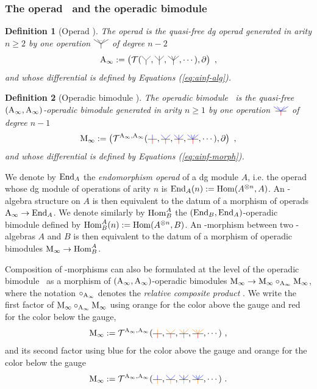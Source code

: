 \documentclass[twoside, 11pt]{amsart}
\newtheorem{definition}{Definition}[section]
\theoremstyle{remark}
\begin{document}
\subsubsection{The operad \Ainf\ and the operadic bimodule \Minf} \label{sss:operad-ainf-operadic-bimod-minf}

\begin{definition}[Operad \Ainf]
The \emph{operad \Ainf} is the quasi-free dg operad generated in arity $n \geq 2$ by one operation $\arbreop{0.15}$ of degree $n-2$ 
\[ \Ainf := \left( \mathcal{T}( \arbreopdeux , \arbreoptrois, \arbreopquatre , \cdots ) , \partial \right) \ , \]
and whose differential is defined by Equations (\ref{eq:ainf-alg}).
\end{definition}

\begin{definition}[Operadic bimodule \Minf]
The operadic bimodule \Minf\ is the quasi-free $(\mathrm{A}_\infty ,\mathrm{A}_\infty )$-operadic bimodule generated in arity $n \geq 1$ by one operation $\arbreopmorph{0.15}$ of degree $n-1$ 
\[ \Minf :=  \left( \mathcal{T}^{\Ainf , \Ainf}(\arbreopunmorph , \arbreopdeuxmorph , \arbreoptroismorph , \arbreopquatremorph , \cdots ) , \partial \right) \ , \]
and whose differential is defined by Equations (\ref{eq:ainf-morph}).
\end{definition}

We denote by $\mathrm{End}_A$ the \textit{endomorphism operad} of a dg module $A$, i.e. the operad whose dg module of operations of arity $n$ is $\mathrm{End}_A(n) := \mathrm{Hom} (A^{\otimes n},A)$. 
An \Ainf -algebra structure on $A$ is then equivalent to the datum of a morphism of operads $\mathrm{A}_\infty \rightarrow \mathrm{End}_A$. 
We denote similarly by $\mathrm{Hom}^A_B$ the $(\mathrm{End}_B , \mathrm{End}_A)$-operadic bimodule defined by $ \mathrm{Hom}^A_B(n) := \mathrm{Hom} (A^{\otimes n},B)$. 
An \Ainf -morphism between two \Ainf -algebras $A$ and $B$ is then equivalent to the datum of a morphism of operadic bimodules $\mathrm{M}_\infty \rightarrow \mathrm{Hom}^A_B$.

Composition of \Ainf -morphisms can also be formulated at the level of the operadic bimodule \Minf\ as a morphism of $(\mathrm{A}_\infty , \mathrm{A}_\infty)$-operadic bimodules $\mathrm{M}_\infty \rightarrow \mathrm{M}_\infty \circ_{\mathrm{A}_\infty} \mathrm{M}_\infty$, where the notation $\circ_{\mathrm{A}_\infty}$ denotes the \emph{relative composite product} \cite[Section 11.2.1]{LodayVallette12}.
We write the first factor of $\mathrm{M}_\infty \circ_{\mathrm{A}_\infty} \mathrm{M}_\infty$ using orange for the color above the gauge and red for the color below the gauge,
\[ \Minf :=  \mathcal{T}^{\Ainf , \Ainf}(\arbreopunmorphcompdeux , \arbreopdeuxmorphcompdeux , \arbreoptroismorphcompdeux , \arbreopquatremorphcompdeux , \cdots ) \ , \]
and its second factor using blue for the color above the gauge and orange for the color below the gauge
\[ \Minf :=  \mathcal{T}^{\Ainf , \Ainf}(\arbreopunmorphcompun , \arbreopdeuxmorphcompun , \arbreoptroismorphcompun , \arbreopquatremorphcompun , \cdots ) \ . \]
\end{document}
